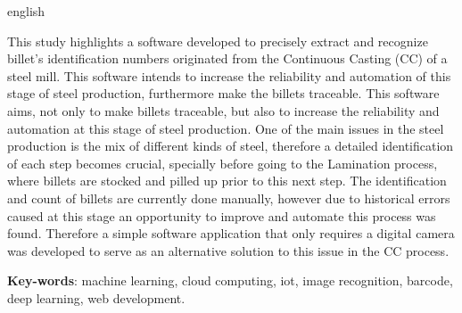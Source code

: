 \documentclass[
	12pt,				%
	oneside,
	a4paper,			%
	english,			%
	brazil				%
	]{abntex2ufop} %
\begin{document}
\begin{resumo}[Abstract]
  \begin{otherlanguage*}{english}

 \noindent 
This study highlights a software developed to precisely extract and recognize billet’s identification numbers originated from the Continuous Casting (CC) of a steel mill.
%
This software intends to increase the reliability and automation of this stage of steel production, furthermore make the billets traceable. 
%
This software aims, not only to make billets traceable, but also to increase the reliability and automation at this stage of steel production.
%
One of the main issues in the steel production is the mix of different kinds of steel, therefore a detailed identification of each step becomes crucial, specially before going to the Lamination process, where billets are stocked and pilled up prior to this next step.
%
The identification and count of billets are currently done manually, however due to historical errors caused at this stage an opportunity to improve and automate this process was found. Therefore a simple software application that only requires a digital camera was developed to serve as an alternative solution to this issue in the CC process.

   \vspace{\onelineskip}
 
   \noindent 
   \textbf{Key-words}: machine learning, cloud computing, iot, image recognition, barcode, deep learning, web development.
  \end{otherlanguage*}
\end{resumo}

% 
%
%  

\listoffigures*
\cleardoublepage
\end{document}
